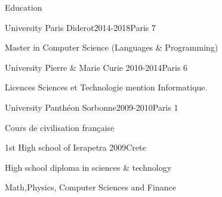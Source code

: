 \documentclass{resume} %
\begin{document}

\begin{rSection}{Education}
	
\begin{rSubsection}{ University Paris Diderot}{2014-2018}{}{Paris 7}
	\item Master in Computer Science (Languages \& Programming)
\end{rSubsection}
\begin{rSubsection}{ University Pierre \& Marie Curie }{2010-2014}{}{Paris 6}
	\item Licences Sciences et Technologie mention Informatique.
\end{rSubsection}
\begin{rSubsection}{ University Panthéon Sorbonne}{2009-2010}{}{Paris 1}
	\item Cours de civilisation française
\end{rSubsection}

\begin{rSubsection}{ 1st High school of Ierapetra }{2009}{}{Crete}
	\item High school diploma in sciences \& technology
	\item Math,Physics, Computer Sciences and Finance
\end{rSubsection}

\end{rSection}

\end{document}

